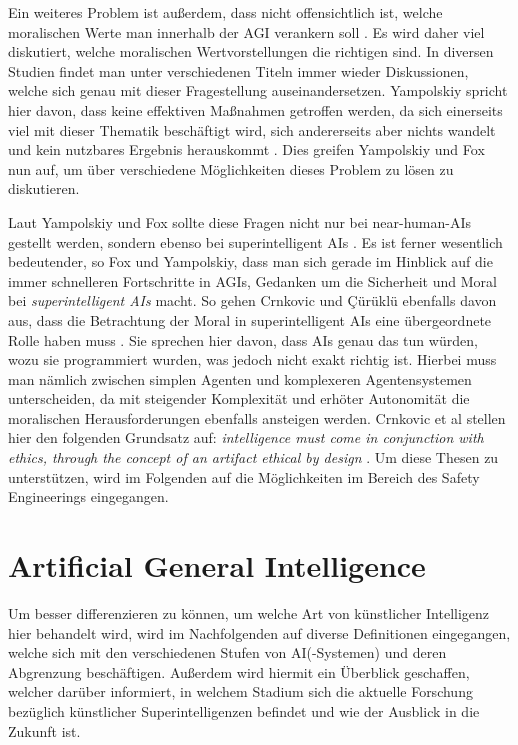             Ein weiteres Problem ist außerdem, dass nicht offensichtlich ist, welche moralischen Werte man innerhalb der
            AGI verankern soll \cite[s. 1]{yampolskiy2013safety}. Es wird daher viel diskutiert, welche moralischen
            Wertvorstellungen die richtigen sind. In diversen Studien findet man unter verschiedenen Titeln immer
            wieder Diskussionen, welche sich genau mit dieser Fragestellung auseinandersetzen. Yampolskiy spricht hier
            davon, dass keine effektiven Maßnahmen getroffen werden, da sich einerseits viel mit dieser Thematik
            beschäftigt wird, sich andererseits aber nichts wandelt und kein nutzbares Ergebnis herauskommt \cite[s. 1]{yampolskiy2013safety}.
            Dies greifen Yampolskiy und Fox nun auf, um über verschiedene Möglichkeiten dieses Problem zu lösen zu diskutieren.

            Laut Yampolskiy und Fox sollte diese Fragen nicht nur bei near-human-AIs gestellt werden, sondern ebenso bei
            superintelligent AIs \cite[s. 2]{yampolskiy2013safety}. Es ist ferner wesentlich bedeutender, so Fox und
            Yampolskiy, dass man sich gerade im Hinblick auf die immer schnelleren Fortschritte in AGIs, Gedanken um die
            Sicherheit und Moral bei \textit{superintelligent AIs} macht. So gehen Crnkovic und {\c{C}}{\"u}r{\"u}kl{\"u}
            ebenfalls davon aus, dass die Betrachtung der Moral in superintelligent AIs eine übergeordnete Rolle haben
            muss \cite*{crnkovic2012robots}. Sie sprechen hier davon, dass AIs genau das tun würden, wozu sie programmiert
            wurden, was jedoch nicht exakt richtig ist. Hierbei muss man nämlich zwischen simplen Agenten und komplexeren
            Agentensystemen unterscheiden, da mit steigender Komplexität und erhöter Autonomität die moralischen
            Herausforderungen ebenfalls ansteigen werden. Crnkovic et al stellen hier den folgenden Grundsatz auf:
            \textit{intelligence must come in conjunction with ethics, through the concept of an artifact ethical by design}
            \cite{crnkovic2012robots}. Um diese Thesen zu unterstützen, wird im Folgenden auf die Möglichkeiten im Bereich
            des Safety Engineerings eingegangen.


    \section{Artificial General Intelligence}
        Um besser differenzieren zu können, um welche Art von künstlicher Intelligenz hier behandelt wird, wird im
        Nachfolgenden auf diverse Definitionen eingegangen, welche sich mit den verschiedenen Stufen von AI(-Systemen)
        und deren Abgrenzung beschäftigen. Außerdem wird hiermit ein Überblick geschaffen, welcher darüber informiert,
        in welchem Stadium sich die aktuelle Forschung bezüglich künstlicher Superintelligenzen befindet und wie der
        Ausblick in die Zukunft ist.

